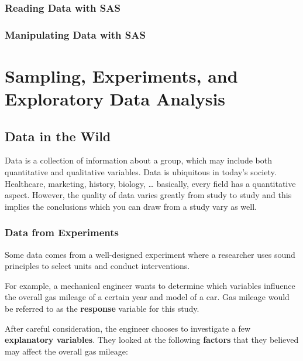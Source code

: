 \documentclass[
]{book}
\theoremstyle{definition}
\theoremstyle{definition}
\theoremstyle{definition}
\theoremstyle{remark}
\begin{document}
\hypertarget{reading-data-with-sas}{%
\subsection{Reading Data with SAS}\label{reading-data-with-sas}}

\hypertarget{manipulating-data-with-sas}{%
\subsection{Manipulating Data with SAS}\label{manipulating-data-with-sas}}

\hypertarget{sampling-experiments-and-exploratory-data-analysis}{%
\chapter{Sampling, Experiments, and Exploratory Data Analysis}\label{sampling-experiments-and-exploratory-data-analysis}}

\hypertarget{data-in-the-wild}{%
\section{Data in the Wild}\label{data-in-the-wild}}

Data is a collection of information about a group, which may include both quantitative and qualitative variables. Data is ubiquitous in today's society. Healthcare, marketing, history, biology, \ldots{} basically, every field has a quantitative aspect. However, the quality of data varies greatly from study to study and this implies the conclusions which you can draw from a study vary as well.

\hypertarget{data-from-experiments}{%
\subsection{Data from Experiments}\label{data-from-experiments}}

Some data comes from a well-designed experiment where a researcher uses sound principles to select units and conduct interventions.

For example, a mechanical engineer wants to determine which variables influence the overall gas mileage of a certain year and model of a car. Gas mileage would be referred to as the \textbf{response} variable for this study.

After careful consideration, the engineer chooses to investigate a few \textbf{explanatory variables}. They looked at the following \textbf{factors} that they believed may affect the overall gas mileage:
\end{document}
